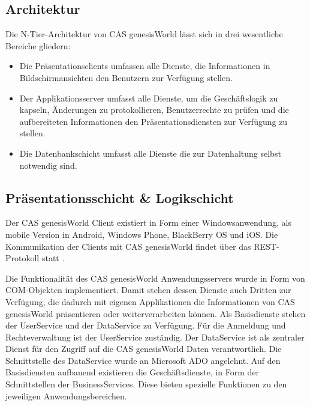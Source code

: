 \subsection{Architektur}

Die N-Tier-Architektur von CAS genesisWorld lässt sich in drei wesentliche Bereiche gliedern:

\begin{itemize}

	\item Die Präsentationsclients umfassen alle Dienste, die Informationen in Bildschirmansichten den Benutzern zur Verfügung stellen.
	
	\item Der Applikationsserver umfasst alle Dienste, um die Geschäftslogik zu kapseln, Änderungen zu protokollieren, Benutzerrechte zu prüfen und die aufbereiteten Informationen den Präsentationsdiensten zur Verfügung zu stellen.
	
	\item Die Datenbankschicht umfasst alle Dienste die zur Datenhaltung selbst notwendig sind.
\end{itemize}


\subsection{Präsentationsschicht \& Logikschicht}

Der CAS genesisWorld Client existiert in Form einer Windowsanwendung, als mobile Version in Android, Windows Phone, BlackBerry OS und iOS. Die Kommunikation der Clients mit CAS genesisWorld findet über das REST-Protokoll statt \cite{cas2013a}.

Die Funktionalität des CAS genesisWorld Anwendungsservers wurde in Form von COM-Objekten implementiert. Damit stehen dessen Dienste auch Dritten zur Verfügung, die dadurch mit eigenen Applikationen die Informationen von CAS genesisWorld präsentieren oder weiterverarbeiten können. Als Basisdienste stehen der UserService und der DataService zu Verfügung. Für die Anmeldung und Rechteverwaltung ist der UserService zuständig. Der DataService ist als zentraler Dienst für den Zugriff auf die CAS genesisWorld Daten verantwortlich. Die Schnittstelle des DataService wurde an Microsoft ADO angelehnt. Auf den Basisdiensten aufbauend existieren die Geschäftsdienste, in Form der Schnittstellen der BusinessServices. Diese bieten spezielle Funktionen zu den jeweiligen Anwendungsbereichen.

